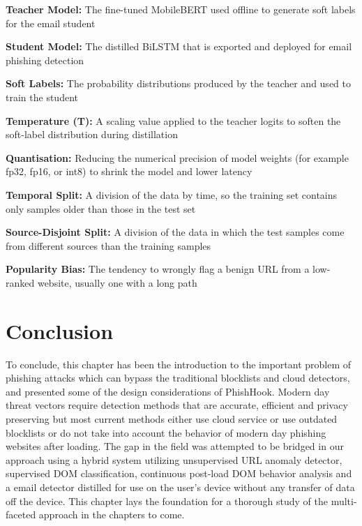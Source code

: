 \documentclass{FastFyp}
\begin{document}
\noindent\textbf{Teacher Model:} The fine-tuned MobileBERT used offline to generate soft labels for the email student\par\medskip
\noindent\textbf{Student Model:} The distilled BiLSTM that is exported and deployed for email phishing detection\par\medskip
\noindent\textbf{Soft Labels:} The probability distributions produced by the teacher and used to train the student\par\medskip
\noindent\textbf{Temperature (T):} A scaling value applied to the teacher logits to soften the soft-label distribution during distillation\par\medskip
\noindent\textbf{Quantisation:} Reducing the numerical precision of model weights (for example fp32, fp16, or int8) to shrink the model and lower latency\par\medskip
\noindent\textbf{Temporal Split:} A division of the data by time, so the training set contains only samples older than those in the test set\par\medskip
\noindent\textbf{Source-Disjoint Split:} A division of the data in which the test samples come from different sources than the training samples\par\medskip
\noindent\textbf{Popularity Bias:} The tendency to wrongly flag a benign URL from a low-ranked website, usually one with a long path\par\medskip


\section{Conclusion}
To conclude, this chapter has been the introduction to the important problem of phishing attacks which can bypass the traditional blocklists and cloud detectors, and presented some of the design considerations of PhishHook. Modern day threat vectors require detection methods that are accurate, efficient and privacy preserving but most current methods either use cloud service or use outdated blocklists or do not take into account the behavior of modern day phishing websites after loading. The gap in the field was attempted to be bridged in our approach using a hybrid system utilizing unsupervised URL anomaly detector, supervised DOM classification, continuous post-load DOM behavior analysis and a email detector distilled for use on the user's device without any transfer of data off the device. This chapter lays the foundation for a thorough study of the multi-faceted approach in the chapters to come.
\end{document}
